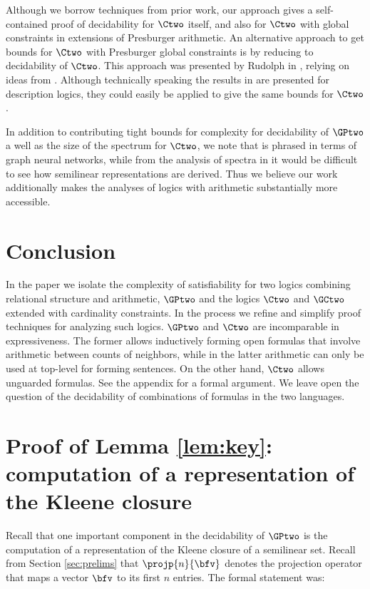 Although we borrow techniques from prior work, our approach gives a self-contained proof of decidability for $\Ctwo$ itself, and also for $\Ctwo$ with global constraints in extensions of Presburger arithmetic. An alternative approach to get bounds for $\Ctwo$ with Presburger global constraints is by reducing to decidability of $\Ctwo$.
This approach was presented by Rudolph in \cite{rudolphcardinality}, relying on ideas from \cite{baadercardinality}. Although technically speaking the results in \cite{rudolphcardinality} are presented for description logics, they could easily be applied to give the same bounds for $\Ctwo$.

In addition to contributing tight bounds for complexity for decidability of $\GPtwo$ a well as the size of the spectrum  for $\Ctwo$, we note that \cite{usicalp} is phrased in terms of graph neural networks, while from the analysis of spectra in \cite{tonyeryk,ultimatelyperiodic} it would be difficult to see how semilinear representations are derived. Thus we believe our work additionally makes the analyses of logics with arithmetic substantially more accessible.


\section{Conclusion} \label{sec:conc}

In the paper we isolate the complexity of satisfiability for two logics combining relational
structure and  arithmetic, $\GPtwo$ and 
the logics $\Ctwo$ and $\GCtwo$ extended with cardinality constraints. In the process we refine and
simplify proof techniques for analyzing such logics.  $\GPtwo$ and $\Ctwo$ are incomparable in expressiveness. The former allows inductively forming open formulas that involve arithmetic between counts of neighbors, while in the latter arithmetic can only be used at top-level for forming sentences. On the other hand, $\Ctwo$ allows unguarded formulas. See the appendix for a formal argument.
We leave open the question of the decidability of combinations of formulas in the two languages. 




\section{Proof of Lemma \ref{lem:key}: computation of a representation of the Kleene closure}

Recall that one important component in the decidability of $\GPtwo$ is the computation of a representation of the Kleene closure of a semilinear set.
Recall from Section \ref{sec:prelims} that $\projp{n}{\bfv}$ denotes the projection operator that maps a vector $\bfv$ to its first $n$ entries.
The formal statement was:

